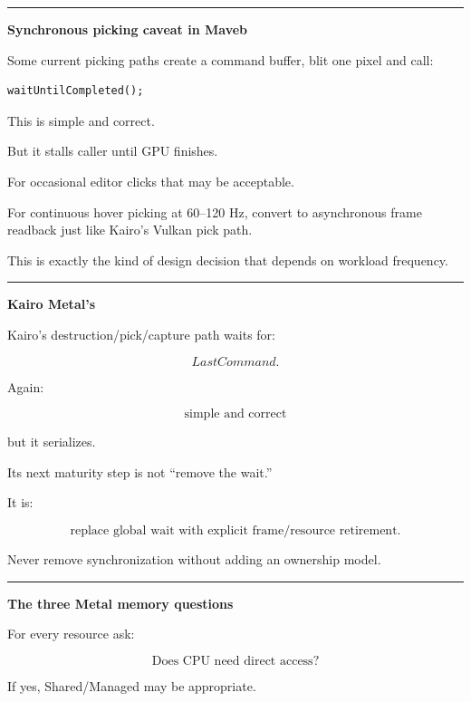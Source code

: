 \begin{center}\rule{0.5\linewidth}{0.5pt}\end{center}

\textbf{Synchronous picking caveat in Maveb}

Some current picking paths create a command buffer, blit one pixel and call:

\begin{verbatim}
waitUntilCompleted();
\end{verbatim}

This is simple and correct.

But it stalls caller until GPU finishes.

For occasional editor clicks that may be acceptable.

For continuous hover picking at 60--120 Hz, convert to asynchronous frame readback just like Kairo's Vulkan pick path.

This is exactly the kind of design decision that depends on workload frequency.

\begin{center}\rule{0.5\linewidth}{0.5pt}\end{center}

\textbf{Kairo Metal's }

Kairo's destruction/pick/capture path waits for:

\[
LastCommand.
\]

Again:

\[
\boxed{
\text{simple and correct}
}
\]

but it serializes.

Its next maturity step is not ``remove the wait.''

It is:

\[
\boxed{
\text{replace global wait with explicit frame/resource retirement}.
}
\]

Never remove synchronization without adding an ownership model.

\begin{center}\rule{0.5\linewidth}{0.5pt}\end{center}

\textbf{The three Metal memory questions}

For every resource ask:

\[
\boxed{
\text{Does CPU need direct access?}
}
\]

If yes, Shared/Managed may be appropriate.

